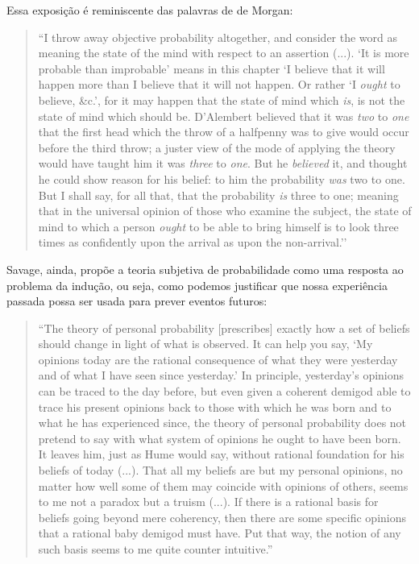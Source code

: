 Essa exposição é reminiscente das palavras de de Morgan:

\begin{quote}
``I throw away objective probability altogether, and consider the word as meaning the state of the mind with respect to an 
assertion (...). `It is more probable than improbable' means in this chapter `I believe that it will happen more than I 
believe that it will not happen. Or rather `I {\em ought} to believe, \&c.', for it may happen that the state of mind which {\em
is}, is not the state of mind which should be. 
D'Alembert believed that it was {\em two} to {\em one} that the first head which the throw of a halfpenny was to give would occur
before the third throw; a juster view of the mode of applying the theory would have taught him it was {\em three} to {\em one}.
But he {\em believed} it, and thought he could show reason for his belief: to him the probability {\em was} two to one. But 
I shall say, for all that, that the probability {\em is} three to one; meaning that in the universal opinion of those who
examine the subject, the state of mind to which a person {\em ought} to be able to bring himself is to look three times
as confidently upon the arrival as upon the non-arrival.''\citep{deMorgan1847}
\end{quote}

Savage, ainda, propõe a teoria subjetiva de probabilidade como uma resposta ao problema da indução, ou seja,
como podemos justificar que nossa experiência passada possa ser usada para prever eventos futuros:

\begin{quote}
``The theory of personal probability [prescribes] exactly how a set of beliefs should change in light of what is observed.
It can help you say, `My opinions today are the rational consequence of what they were yesterday and of what I have seen
since yesterday.' In principle, yesterday's opinions can be traced to the day before, but even given a coherent demigod
able to trace his present opinions back to those with which he was born and to what he has experienced since, the theory
of personal probability does not pretend to say with what system of opinions he ought to have been born. It leaves him, just
as Hume would say, without rational foundation for his beliefs of today (...). That all my beliefs are but my personal
opinions, no matter how well some of them may coincide with opinions of others, seems to me not a paradox but a truism (...).
If there is a rational basis for beliefs going beyond mere coherency, then there are some specific opinions that a rational
baby demigod must have. Put that way, the notion of any such basis seems to me quite counter intuitive.'' \citep{Savage67}
\end{quote}

